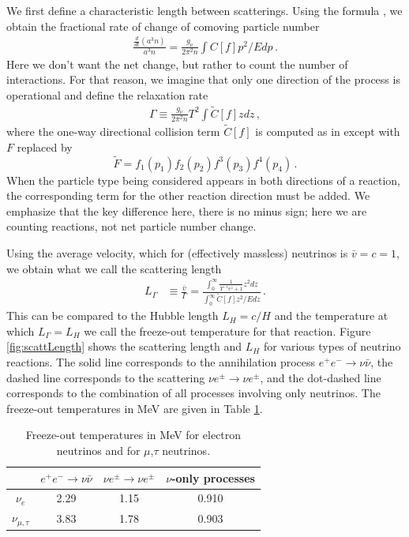 We first define a characteristic length between scatterings. Using the formula , we obtain the fractional rate of change of comoving particle number
\begin{align}
\frac{\frac{d}{dt}(a^3 n)}{a^3n}=\frac{g_\nu}{2\pi^2n}\int C[f]p^2/Edp\,.
\end{align}
Here we don't want the net change, but rather to count the number of interactions. For that reason, we imagine that only one direction of the process is operational and define the relaxation rate
\begin{align}
\Gamma\equiv\frac{g_\nu}{2\pi^2n}T^2\int \tilde C[f]zdz\,,
\end{align}
where the one-way directional collision term $\tilde C[f]$ is computed as in  except with $F$ replaced by 
\begin{equation}
\tilde F=f_1(p_1)f_2(p_2)f^3(p_3)f^4(p_4)\,.
\end{equation}
When the particle type being considered appears in both directions of a reaction, the corresponding term for the other reaction direction must be added. We emphasize that the key difference here, there is no minus sign; here we are counting reactions, not net particle number change.

Using the average velocity, which for (effectively massless) neutrinos is $\bar v=c=1$, we obtain what we call the scattering length
\begin{align}
L_\Gamma&\equiv\frac{\bar v}{\Gamma}=\frac{\int_0^\infty\frac{1}{\Upsilon^{-1}e^z+1}z^2dz}{\int_0^\infty \tilde C[f] z^2/E dz}\,.
\end{align}
This can be compared to the Hubble length $L_H=c/H$ and the temperature at which $L_\Gamma=L_H$ we call the freeze-out temperature for that reaction. Figure \ref{fig:scattLength} shows the scattering length and $L_H$ for various types of neutrino reactions. The solid line corresponds to the annihilation process $e^+e^-\rightarrow \nu\bar\nu$, the dashed line corresponds to the scattering $\nu e^\pm\rightarrow \nu e^\pm$, and the dot-dashed line corresponds to the combination of all processes involving only neutrinos. The freeze-out temperatures in MeV are given in Table \ref{table:freezeoutTemp}.

\begin{table}[ht]
\centering 
\begin{tabular}{|c|c|c|c|}
\hline
 & $e^+e^-\rightarrow \nu\bar\nu$ & $\nu e^\pm\rightarrow \nu e^\pm$ & $\nu$-only processes\\
\hline
$\nu_e$ &2.29 & 1.15&0.910\\
\hline
$\nu_{\mu,\tau}$ &3.83 & 1.78& 0.903\\
\hline
\end{tabular}
\caption{Freeze-out temperatures in MeV for electron neutrinos and for $\mu$,$\tau$ neutrinos.}
\label{table:freezeoutTemp}
\end{table}


